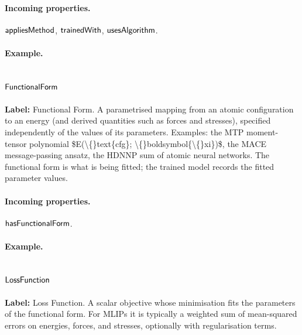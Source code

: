 \paragraph{Incoming properties.} $\mathsf{appliesMethod}$, $\mathsf{trainedWith}$, $\mathsf{usesAlgorithm}$.

\paragraph{Example.}

\subsection{$\mathsf{FunctionalForm}$}
\label{sec:term-FunctionalForm}

\textbf{Label:} Functional Form.
A parametrised mapping from an atomic configuration to an energy (and derived quantities such as forces and stresses), specified independently of the values of its parameters. Examples: the MTP moment-tensor polynomial \$E(\textbackslash\{\}text\{cfg\}; \textbackslash\{\}boldsymbol\{\textbackslash\{\}xi\})\$, the MACE message-passing ansatz, the HDNNP sum of atomic neural networks. The functional form is what is being fitted; the trained model records the fitted parameter values.

\paragraph{Incoming properties.} $\mathsf{hasFunctionalForm}$.

\paragraph{Example.}

\subsection{$\mathsf{LossFunction}$}
\label{sec:term-LossFunction}

\textbf{Label:} Loss Function.
A scalar objective whose minimisation fits the parameters of the functional form. For MLIPs it is typically a weighted sum of mean-squared errors on energies, forces, and stresses, optionally with regularisation terms.

